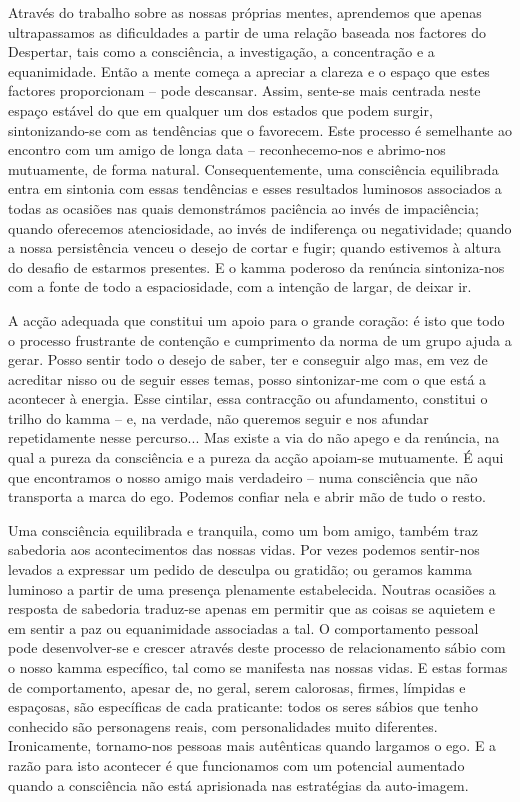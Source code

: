 Através do trabalho sobre as nossas próprias mentes, aprendemos que apenas ultrapassamos as dificuldades a partir de uma relação baseada nos factores do Despertar, tais como a consciência, a investigação, a concentração e a equanimidade. Então a mente começa a apreciar a clareza e o espaço que estes factores proporcionam -- pode descansar. Assim, sente-se mais centrada neste espaço estável do que em qualquer um dos estados que podem surgir, sintonizando-se com as tendências que o favorecem. Este processo é semelhante ao encontro com um amigo de longa data -- reconhecemo-nos e abrimo-nos mutuamente, de forma natural. Consequentemente, uma consciência equilibrada entra em sintonia com essas tendências e esses resultados luminosos associados a todas as ocasiões nas quais demonstrámos paciência ao invés de impaciência; quando oferecemos atenciosidade, ao invés de indiferença ou negatividade; quando a nossa persistência venceu o desejo de cortar e fugir; quando estivemos à altura do desafio de estarmos presentes. E o kamma poderoso da renúncia sintoniza-nos com a fonte de todo a espaciosidade, com a intenção de largar, de deixar ir.

A acção adequada que constitui um apoio para o grande coração: é isto que todo o processo frustrante de contenção e cumprimento da norma de um grupo ajuda a gerar. Posso sentir todo o desejo de saber, ter e conseguir algo mas, em vez de acreditar nisso ou de seguir esses temas, posso sintonizar-me com o que está a acontecer à energia. Esse cintilar, essa contracção ou afundamento, constitui o trilho do kamma -- e, na verdade, não queremos seguir e nos afundar repetidamente nesse percurso... Mas existe a via do não apego e da renúncia, na qual a pureza da consciência e a pureza da acção apoiam-se mutuamente. É aqui que encontramos o nosso amigo mais verdadeiro -- numa consciência que não transporta a marca do ego. Podemos confiar nela e abrir mão de tudo o resto.

Uma consciência equilibrada e tranquila, como um bom amigo, também traz sabedoria aos acontecimentos das nossas vidas. Por vezes podemos sentir-nos levados a expressar um pedido de desculpa ou gratidão; ou geramos kamma luminoso a partir de uma presença plenamente estabelecida. Noutras ocasiões a resposta de sabedoria traduz-se apenas em permitir que as coisas se aquietem e em sentir a paz ou equanimidade associadas a tal. O comportamento pessoal pode desenvolver-se e crescer através deste processo de relacionamento sábio com o nosso kamma específico, tal como se manifesta nas nossas vidas. E estas formas de comportamento, apesar de, no geral, serem calorosas, firmes, límpidas e espaçosas, são específicas de cada praticante: todos os seres sábios que tenho conhecido são personagens reais, com personalidades muito diferentes. Ironicamente, tornamo-nos pessoas mais autênticas quando largamos o ego. E a razão para isto acontecer é que funcionamos com um potencial aumentado quando a consciência não está aprisionada nas estratégias da auto-imagem.
